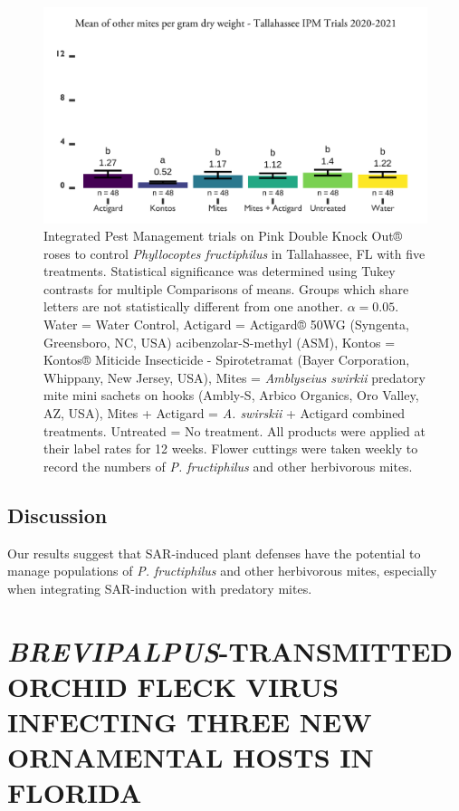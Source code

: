 \documentclass[12pt,final,CPage]{ufthesis}
\begin{document}
{\begin{figure}
  {\centering \includegraphics[width=0.8\linewidth]{figure/rrv_ipm_graph_other_talla} 

  }

  \caption{Integrated Pest Management trials on Pink Double Knock Out® roses to control \textit{Phyllocoptes fructiphilus} in Tallahassee, FL with five treatments. Statistical significance was determined using Tukey contrasts for multiple Comparisons of means. Groups which share letters are not statistically different from one another. $\alpha = 0.05$. Water = Water Control, Actigard = Actigard® 50WG (Syngenta, Greensboro, NC, USA) acibenzolar-S-methyl (ASM), Kontos = Kontos® Miticide Insecticide - Spirotetramat (Bayer Corporation, Whippany, New Jersey, USA), Mites = \textit{Amblyseius swirkii} predatory mite mini sachets on hooks (Ambly-S, Arbico Organics, Oro Valley, AZ, USA), Mites + Actigard = \textit{A. swirskii} + Actigard combined treatments. Untreated = No treatment. All products were applied at their label rates for 12 weeks. Flower cuttings were taken weekly to record the numbers of \textit{P. fructiphilus} and other herbivorous mites.}\label{fig:ipm-talla-other}
  \end{figure}
  \hypertarget{dis-asm-ipm}{%
  \section{Discussion}\label{dis-asm-ipm}}

  Our results suggest that SAR-induced plant defenses have the potential to manage populations of \emph{P. fructiphilus} and other herbivorous mites, especially when integrating SAR-induction with predatory mites.

  \hypertarget{brevipalpus-transmitted-orchid-fleck-virus-infecting-three-new-ornamental-hosts-in-florida}{%
  \chapter{\texorpdfstring{\emph{BREVIPALPUS}-TRANSMITTED ORCHID FLECK VIRUS INFECTING THREE NEW ORNAMENTAL HOSTS IN FLORIDA}{BREVIPALPUS-TRANSMITTED ORCHID FLECK VIRUS INFECTING THREE NEW ORNAMENTAL HOSTS IN FLORIDA}}\label{brevipalpus-transmitted-orchid-fleck-virus-infecting-three-new-ornamental-hosts-in-florida}}

}
\end{document}
